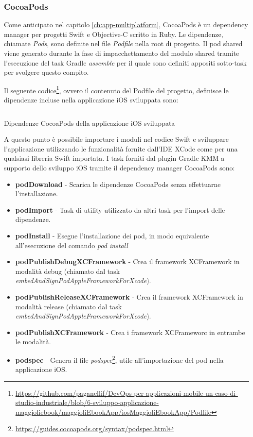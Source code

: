 \subsubsection*{CocoaPods}
Come anticipato nel capitolo \ref{ch:app-multiplatform}, CocoaPods è un dependency manager per progetti Swift e Objective-C scritto in Ruby. Le dipendenze, chiamate \textit{Pods}, sono definite nel file \textit{Podfile} nella root di progetto. Il pod shared viene generato durante la fase di impacchettamento del modulo shared tramite l’esecuzione del task Gradle \textit{assemble} per il quale sono definiti appositi sotto-task per svolgere questo compito.

Il seguente codice\footnote{\href{https://github.com/paganellif/DevOps-per-applicazioni-mobile-un-caso-di-studio-industriale/blob/6-sviluppo-applicazione-maggioliebook/maggioliEbookApp/iosMaggioliEbookApp/Podfile}{https://github.com/paganellif/DevOps-per-applicazioni-mobile-un-caso-di-studio-industriale/blob/6-sviluppo-applicazione-maggioliebook/maggioliEbookApp/iosMaggioliEbookApp/Podfile}}, ovvero il contenuto del Podfile del progetto, definisce le dipendenze incluse nella applicazione iOS sviluppata sono:

\begin{listing}[H]
    \inputminted{ruby}{code/Podfile}
    \caption{Dipendenze CocoaPods della applicazione iOS sviluppata}
\end{listing}

A questo punto è possibile importare i moduli nel codice Swift e sviluppare l'applicazione utilizzando le funzionalità fornite dall'IDE XCode come per una qualsiasi libreria Swift importata. I task forniti dal plugin Gradle KMM a supporto dello sviluppo iOS tramite il dependency manager CocoaPods sono:

\begin{itemize}
    \item \textbf{podDownload} - Scarica le dipendenze CocoaPods senza effettuarne l'installazione.
    \item \textbf{podImport} - Task di utility utilizzato da altri task per l'import delle dipendenze.
    \item \textbf{podInstall} - Esegue l'installazione dei pod, in modo equivalente all'esecuzione del comando \textit{pod install}
    \item \textbf{podPublishDebugXCFramework} - Crea il framework XCFramework in modalità debug (chiamato dal task \textit{embedAndSignPodAppleFrameworkForXcode}).
    \item \textbf{podPublishReleaseXCFramework} - Crea il framework XCFramework in modalità release (chiamato dal task \textit{embedAndSignPodAppleFrameworkForXcode}).
    \item \textbf{podPublishXCFramework} - Crea i framework XCFrameworc in entrambe le modalità.
    \item \textbf{podspec} - Genera il file \textit{podspec}\footnote{\href{https://guides.cocoapods.org/syntax/podspec.html}{https://guides.cocoapods.org/syntax/podspec.html}}, utile all'importazione del pod nella applicazione iOS.
\end{itemize}

